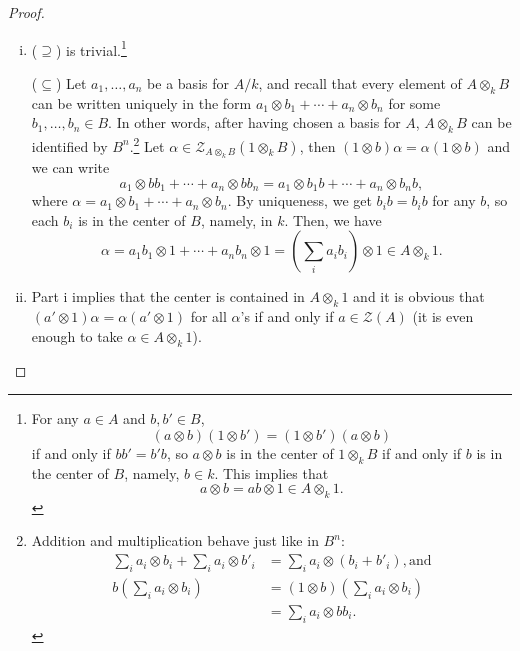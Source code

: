 \documentclass{tufte-handout} %
\theoremstyle{definition}
\theoremstyle{remark}
\newcommand{\bra}[1]{\left(#1\right)}
\newcommand{\mZ}{\mathcal{Z}}
\begin{document}
\begin{proof}
	\begin{enumerate}[i.]
		\item ($\supseteq$) is trivial.\footnote{For any $a \in A$ and $b,b' \in B$, \[(a\otimes b)(1 \otimes b') = (1 \otimes b')(a\otimes b)\] if and only if $bb' = b'b$, so $a \otimes b$ is in the center of $1 \otimes_k B$ if and only if $b$ is in the center of $B$, namely, $b \in k$. This implies that \[a\otimes b = ab\otimes 1 \in A \otimes_k 1.\]}
		
		($\subseteq$) Let $a_1, \dots, a_n$ be a basis for $A/k$, and recall that every element of $A \otimes_k B$ can be written uniquely in the form $a_1 \otimes b_1 + \cdots + a_n \otimes b_n$ for some $b_1, \dots, b_n \in B$. In other words, after having chosen a basis for $A$, $A \otimes_k B$ can be identified by $B^n$.\footnote{Addition and multiplication behave just like in $B^n$:
		\begin{align*}
			\sum_i a_i \otimes b_i + \sum_i a_i \otimes b'_i &= \sum_i a_i \otimes (b_i + b'_i),\text{and}\\
			b\bra{\sum_i a_i \otimes b_i} &= (1\otimes b)\bra{\sum_i a_i \otimes b_i}\\
			&= \sum_i a_i \otimes bb_i.
		\end{align*}} Let $\alpha \in \mZ_{A\otimes_k B}(1 \otimes_k B)$, then $(1 \otimes b)\alpha = \alpha(1\otimes b)$ and we can write 
		\[a_1 \otimes bb_1 + \cdots + a_n \otimes bb_n = a_1 \otimes b_1b + \cdots + a_n \otimes b_nb,\]
		where $\alpha = a_1 \otimes b_1 + \cdots + a_n \otimes b_n$. By uniqueness, we get $b_ib = b_ib$ for any $b$, so each $b_i$ is in the center of $B$, namely, in $k$. Then, we have 
		\[\alpha = a_1b_1 \otimes 1 + \cdots + a_nb_n \otimes 1 = \bra{\sum_i a_ib_i}\otimes 1 \in A \otimes_k 1.\]
		
		\item Part i implies that the center is contained in $A \otimes_k 1$ and it is obvious that $(a' \otimes 1)\alpha = \alpha(a' \otimes 1)$ for all $\alpha$'s if and only if $a \in \mZ(A)$ (it is even enough to take $\alpha \in A \otimes_k 1$).
	\end{enumerate}
\end{proof}
\end{document}
